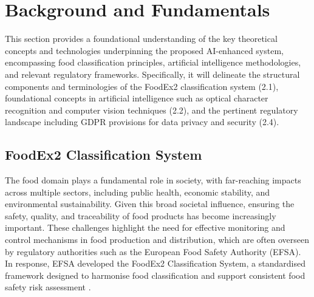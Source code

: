 \hypertarget{background-and-fundamentals}{%
\chapter{Background and Fundamentals}\label{background-and-fundamentals}}

This section provides a foundational understanding of the key theoretical concepts and technologies underpinning the proposed AI-enhanced system, encompassing food classification principles, artificial intelligence methodologies, and relevant regulatory frameworks. Specifically, it will delineate the structural components and terminologies of the FoodEx2 classification system (2.1), foundational concepts in artificial intelligence such as optical character recognition and computer vision techniques (2.2), and the pertinent regulatory landscape including GDPR provisions for data privacy and security (2.4).

\hypertarget{foodex2-classification-system}{%
\section{FoodEx2 Classification System}\label{foodex2-classification-system}}

The food domain plays a fundamental role in society, with far-reaching impacts across multiple sectors, including public health, economic stability, and environmental sustainability. Given this broad societal influence, ensuring the safety, quality, and traceability of food products has become increasingly important. These challenges highlight the need for effective monitoring and control mechanisms in food production and distribution, which are often overseen by regulatory authorities such as the European Food Safety Authority (EFSA). In response, EFSA developed the FoodEx2 Classification System, a standardised framework designed to harmonise food classification and support consistent food safety risk assessment \parencite{hern_n_g__redondo_919f3cec}.

